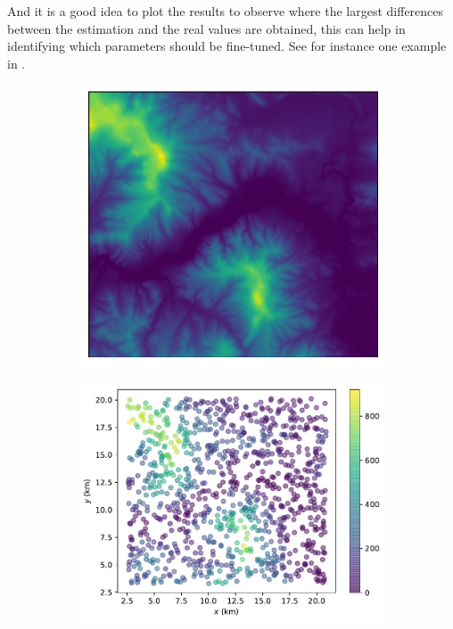 And it is a good idea to plot the results to observe where the largest differences between the estimation and the real values are obtained, this can help in identifying which parameters should be fine-tuned.
See for instance one example in .
\begin{figure}
  \centering
  \begin{subfigure}[b]{0.40\linewidth}
    \centering
    \includegraphics[width=\textwidth]{figs/jackknife/jk1.pdf}
    \caption{}
  \end{subfigure}
  \quad
  \begin{subfigure}[b]{0.475\linewidth}
    \centering
    \includegraphics[width=\textwidth]{figs/jackknife/jk2.pdf}

\end{subfigure}
\end{figure}
